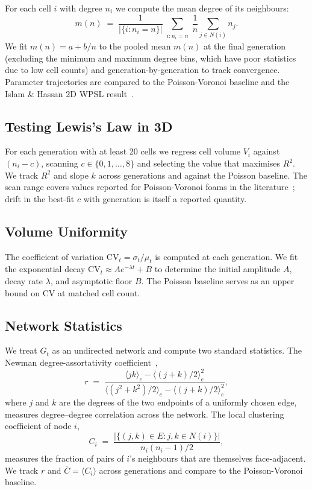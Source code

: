 \documentclass[aps,pre,reprint,amsmath,amssymb,floatfix]{revtex4-2}
\begin{document}
For each cell $i$ with degree $n_i$ we compute the mean degree of its
neighbours:
\[
  m(n) \;=\; \frac{1}{|\{i:n_i=n\}|}
             \sum_{\substack{i:n_i=n}} \frac{1}{n}
             \sum_{j\in N(i)} n_j.
\]
We fit $m(n)=a+b/n$ to the pooled mean $m(n)$ at the final generation
(excluding the minimum and maximum degree bins, which have poor statistics
due to low cell counts) and generation-by-generation to track convergence.
Parameter trajectories are compared to the Poisson-Voronoi baseline and
the Islam \& Hassan 2D WPSL result~\cite{islam2014}.

\subsection{Testing Lewis's Law in 3D}

For each generation with at least 20 cells we regress cell volume $V_i$
against $(n_i-c)$, scanning $c\in\{0,1,\ldots,8\}$ and selecting the value
that maximises $R^2$.
We track $R^2$ and slope $k$ across generations and against the Poisson
baseline.
The scan range covers values reported for Poisson-Voronoi foams in the
literature~\cite{lazar2013}; drift in the best-fit $c$ with generation is
itself a reported quantity.

\subsection{Volume Uniformity}

The coefficient of variation $\mathrm{CV}_t=\sigma_t/\mu_t$ is computed at
each generation.
We fit the exponential decay $\mathrm{CV}_t\approx Ae^{-\lambda t}+B$ to
determine the initial amplitude $A$, decay rate $\lambda$, and asymptotic
floor $B$.
The Poisson baseline serves as an upper bound on $\mathrm{CV}$ at matched
cell count.

\subsection{Network Statistics}

We treat $G_t$ as an undirected network and compute two standard statistics.
The Newman degree-assortativity coefficient~\cite{newman2002},
\[
  r \;=\; \frac{\langle jk\rangle_e - \langle(j+k)/2\rangle_e^2}
               {\langle(j^2+k^2)/2\rangle_e - \langle(j+k)/2\rangle_e^2},
\]
where $j$ and $k$ are the degrees of the two endpoints of a uniformly chosen
edge, measures degree--degree correlation across the network.
The local clustering coefficient of node $i$,
\[
  C_i \;=\; \frac{|\{(j,k)\in E: j,k\in N(i)\}|}{n_i(n_i-1)/2},
\]
measures the fraction of pairs of $i$'s neighbours that are themselves
face-adjacent.
We track $r$ and $\bar{C}=\langle C_i\rangle$ across generations and compare
to the Poisson-Voronoi baseline.
\end{document}

